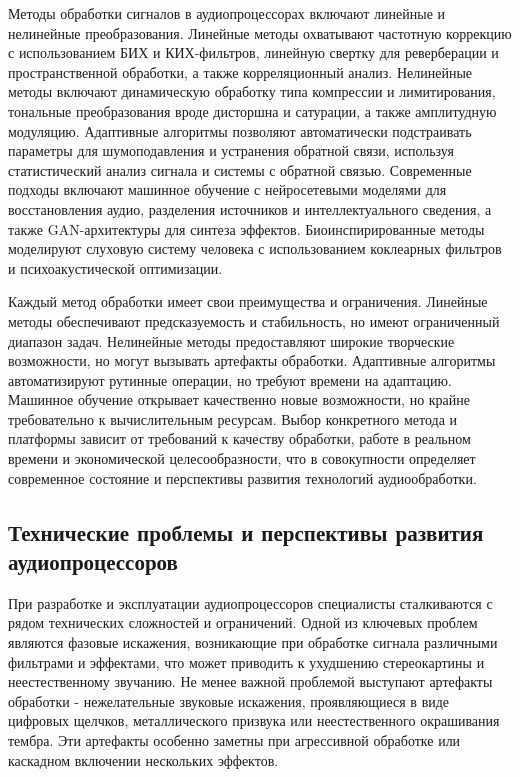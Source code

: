Методы обработки сигналов в аудиопроцессорах включают линейные и нелинейные преобразования. Линейные методы охватывают частотную коррекцию с использованием БИХ и КИХ-фильтров, линейную свертку для реверберации и пространственной обработки, а также корреляционный анализ. Нелинейные методы включают динамическую обработку типа компрессии и лимитирования, тональные преобразования вроде дисторшна и сатурации, а также амплитудную модуляцию. Адаптивные алгоритмы позволяют автоматически подстраивать параметры для шумоподавления и устранения обратной связи, используя статистический анализ сигнала и системы с обратной связью. Современные подходы включают машинное обучение с нейросетевыми моделями для восстановления аудио, разделения источников и интеллектуального сведения, а также GAN-архитектуры для синтеза эффектов. Биоинспирированные методы моделируют слуховую систему человека с использованием коклеарных фильтров и психоакустической оптимизации.

Каждый метод обработки имеет свои преимущества и ограничения. Линейные методы обеспечивают предсказуемость и стабильность, но имеют ограниченный диапазон задач. Нелинейные методы предоставляют широкие творческие возможности, но могут вызывать артефакты обработки. Адаптивные алгоритмы автоматизируют рутинные операции, но требуют времени на адаптацию. Машинное обучение открывает качественно новые возможности, но крайне требовательно к вычислительным ресурсам. Выбор конкретного метода и платформы зависит от требований к качеству обработки, работе в реальном времени и экономической целесообразности, что в совокупности определяет современное состояние и перспективы развития технологий аудиообработки.

\subsection{Технические проблемы и перспективы развития аудиопроцессоров}
При разработке и эксплуатации аудиопроцессоров специалисты сталкиваются с рядом технических сложностей и ограничений. Одной из ключевых проблем являются фазовые искажения, возникающие при обработке сигнала различными фильтрами и эффектами, что может приводить к ухудшению стереокартины и неестественному звучанию. Не менее важной проблемой выступают артефакты обработки - нежелательные звуковые искажения, проявляющиеся в виде цифровых щелчков, металлического призвука или неестественного окрашивания тембра. Эти артефакты особенно заметны при агрессивной обработке или каскадном включении нескольких эффектов.

